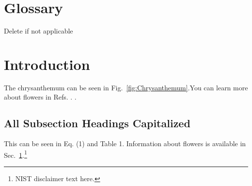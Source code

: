 \documentclass[12pt]{article}
\begin{document}
\section*{Glossary}
Delete if not applicable\\
\pagebreak
\section{Introduction}
\label{sec:intro}
\normalsize The chrysanthemum can be seen in Fig.~\ref{fig:Chrysanthemum}.You can learn more about flowers in Refs. \cite{wilkinson_1990,Xiong2015,Prives2016,Roberts1982,Maloney2016,giancoli2008physics,Eston1993,MSU-CSE-06-2,Farindon,Marcheford,Joslin,Caxton,Isley,FIPS1402,SP80053r4}. . 
\subsection{All Subsection Headings Capitalized}
\label{ssec:headingscap}
This can be seen in Eq. (1) and Table 1. Information about flowers is available in Sec.~\ref{sec:intro}.\footnote{NIST disclaimer text here.}
\end{document}
